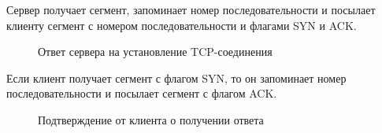 \documentclass[a4paper, 14pt,russian]{article}
\begin{document}
		Сервер получает сегмент, запоминает номер последовательности и посылает клиенту сегмент с номером последовательности и флагами SYN и ACK.
		\begin{figure}[h!]
			\caption{Ответ сервера на установление TCP-соединения}
			\label{img:tcp_syn_ack}
		\end{figure}
		Если клиент получает сегмент с флагом SYN, то он запоминает номер последовательности и посылает сегмент с флагом ACK.
		\begin{figure}[h!]
			\caption{Подтверждение от клиента о получении ответа}
			\label{img:tcp_ack}
		\end{figure}
	
		
\end{document}
